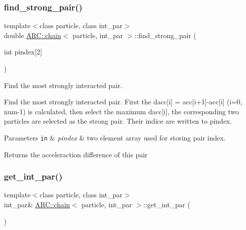 \subsubsection{\texorpdfstring{find\+\_\+strong\+\_\+pair()}{find\_strong\_pair()}}
{\footnotesize\ttfamily template$<$class particle, class int\+\_\+par$>$ \\
double \hyperlink{classARC_1_1chain}{A\+R\+C\+::chain}$<$ particle, int\+\_\+par $>$\+::find\+\_\+strong\+\_\+pair (\begin{DoxyParamCaption}\item[{int}]{pindex\mbox{[}2\mbox{]} }\end{DoxyParamCaption})\hspace{0.3cm}{\ttfamily [inline]}}



Find the most strongly interacted pair. 

Find the most strongly interacted pair. First the dacc\mbox{[}i\mbox{]} = acc\mbox{[}i+1\mbox{]}-\/acc\mbox{[}i\mbox{]} (i=0, num-\/1) is calculated, then select the maximum dacc\mbox{[}i\mbox{]}, the corresponding two particles are selected as the strong pair. Their indice are written to pindex. 
\begin{DoxyParams}[1]{Parameters}
\mbox{\tt in}  & {\em pindex} & two element array used for storing pair index. \\
\hline
\end{DoxyParams}
\begin{DoxyReturn}{Returns}
the acceleraction difference of this pair 
\end{DoxyReturn}
\hypertarget{classARC_1_1chain_af9bdf54999606c0d6f32843f0d53d8c4}{}\label{classARC_1_1chain_af9bdf54999606c0d6f32843f0d53d8c4} 
\subsubsection{\texorpdfstring{get\+\_\+int\+\_\+par()}{get\_int\_par()}}
{\footnotesize\ttfamily template$<$class particle, class int\+\_\+par$>$ \\
int\+\_\+par\& \hyperlink{classARC_1_1chain}{A\+R\+C\+::chain}$<$ particle, int\+\_\+par $>$\+::get\+\_\+int\+\_\+par (\begin{DoxyParamCaption}{ }\end{DoxyParamCaption})\hspace{0.3cm}{\ttfamily [inline]}}



